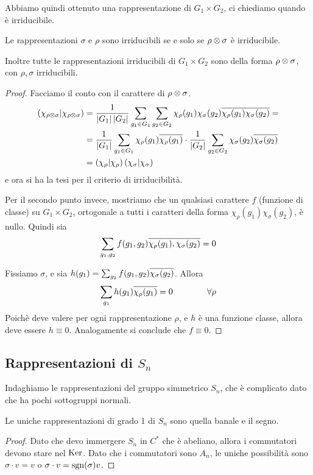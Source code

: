   Abbiamo quindi ottenuto una rappresentazione di $G_1\times G_2$, ci chiediamo quando è irriducibile. 
   \begin{myprop}
    Le rappresentazioni $\sigma$ e $\rho$ sono irriducibili se e solo se $\rho \otimes \sigma$ è irriducibile.
    
    Inoltre tutte le rappresentazioni irriducibili di $G_1\times G_2$ sono della forma $\rho \otimes \sigma$, con $\rho,\sigma$ irriducibili.
   \end{myprop}
   \begin{proof}
    Facciamo il conto con il carattere di $\rho \otimes \sigma$.
    \begin{align*}
     \left(\chi_{\rho\otimes\sigma} | \chi_{\rho\otimes\sigma}\right) &= \frac1{\left|G_1\right|\left|G_2\right|}\sum_{g_1 \in G_1}\sum_{g_2\in G_2} \chi_\rho(g_1)\chi_\sigma(g_2)\overline{\chi_\rho(g_1)\chi_\sigma(g_2)} = \\
     &= \frac1{\left|G_1\right|}\sum_{g_1 \in G_1} \chi_\rho(g_1)\overline{\chi_\rho(g_1)}\cdot\frac1{\left|G_2\right|}\sum_{g_2\in G_2}\chi_\sigma(g_2)\overline{\chi_\sigma(g_2)}\\
     &= \left(\chi_\rho | \chi_\rho\right)\left(\chi_\sigma | \chi_\sigma\right)
    \end{align*}
    e ora si ha la tesi per il criterio di irriducibilità.
    
    Per il secondo punto invece, mostriamo che un qualsiasi carattere $f$ (funzione di classe) su $G_1\times G_2$, ortogonale a tutti i caratteri della forma $\chi_\rho(g_1)\chi_\sigma(g_2)$, è nullo. Quindi sia
    \[
     \sum_{g_1,g_2} f(g_1,g_2) \overline{\chi_\rho(g_1),\chi_\sigma(g_2)}=0
    \]
    
    Fissiamo $\sigma$, e sia $h(g_1)=\sum_{g_2} f(g_1,g_2)\overline{\chi_\sigma(g_2)}$. Allora
    \[
     \sum_{g_1}h(g_1)\overline{\chi_\rho(g_1)}=0 \qquad\qquad \forall \rho
    \]
    Poichè deve valere per ogni rappresentazione $\rho$, e $h$ è una funzione classe, allora deve essere $h\equiv 0$. Analogamente si conclude che $f \equiv 0$.


   \end{proof}
   
  \subsection{Rappresentazioni di $S_n$}
    Indaghiamo le rappresentazioni del gruppo simmetrico $S_n$, che è complicato dato che ha pochi sottogruppi normali.
    
    \begin{myprop}
     Le uniche rappresentazioni di grado 1 di $S_n$ sono quella banale e il segno.
    \end{myprop}
    \begin{proof}
     Dato che devo immergere $S_n$ in $C^*$ che è abeliano, allora i commutatori devono stare nel $\operatorname{Ker}$. Dato che i commutatori sono $A_n$, le uniche possibilità sono $\sigma \cdot v = v$ o $\sigma \cdot v=\operatorname{sgn}(\sigma)v$.
    \end{proof}
    
